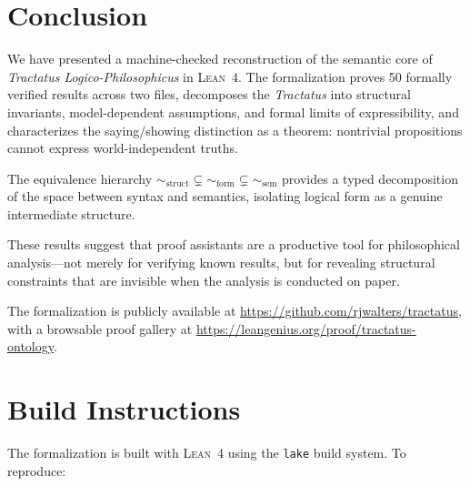\documentclass[10pt, letterpaper]{article}
\theoremstyle{definition}
\theoremstyle{remark}
\newcommand{\structEq}{\sim_{\mathrm{struct}}}
\newcommand{\formEq}{\sim_{\mathrm{form}}}
\newcommand{\semEq}{\sim_{\mathrm{sem}}}
\newcommand{\Lean}{\textsc{Lean}}
\begin{document}
\section{Conclusion}
\label{sec:conclusion}

We have presented a machine-checked reconstruction of the
semantic core of \emph{Tractatus Logico-Philosophicus} in
\Lean~4.  The formalization proves 50 formally verified results
across two files, decomposes the
\emph{Tractatus} into structural invariants, model-dependent
assumptions, and formal limits of expressibility, and
characterizes the saying/showing distinction as a theorem:
nontrivial propositions cannot express world-independent truths.

The equivalence hierarchy $\structEq \subsetneq \formEq
\subsetneq \semEq$ provides a typed decomposition of the space
between syntax and semantics, isolating logical form as a
genuine intermediate structure.

These results suggest that proof assistants are a productive tool
for philosophical analysis---not merely for verifying known
results, but for revealing structural constraints that are
invisible when the analysis is conducted on paper.

The formalization is publicly available at
\url{https://github.com/rjwalters/tractatus}, with a
browsable proof gallery at
\url{https://leangenius.org/proof/tractatus-ontology}.


\appendix

\section{Build Instructions}
\label{app:build}

The formalization is built with \Lean~4 using the \texttt{lake}
build system.  To reproduce:
\end{document}
